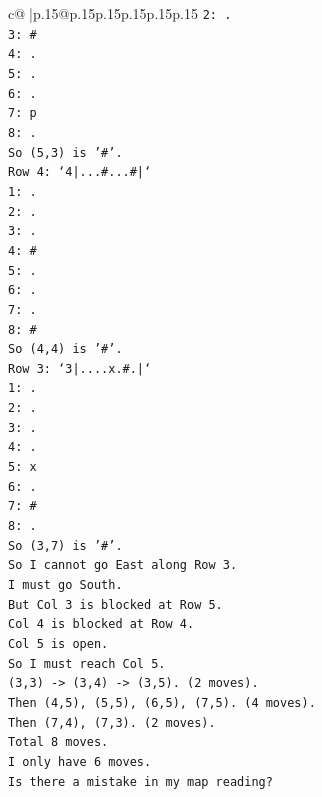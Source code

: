 \documentclass{article}
\begin{document}
{\begin{supertabular}{c@{$\;$}|p{.15\linewidth}@{}p{.15\linewidth}p{.15\linewidth}p{.15\linewidth}p{.15\linewidth}p{.15\linewidth}}
{{{\texttt{2: .} \\
\texttt{3: \#} \\
\texttt{4: .} \\
\texttt{5: .} \\
\texttt{6: .} \\
\texttt{7: p} \\
\texttt{8: .} \\
\texttt{So (5,3) is '\#'.} \\
\texttt{Row 4: `4|...\#...\#|`} \\
\texttt{1: .} \\
\texttt{2: .} \\
\texttt{3: .} \\
\texttt{4: \#} \\
\texttt{5: .} \\
\texttt{6: .} \\
\texttt{7: .} \\
\texttt{8: \#} \\
\texttt{So (4,4) is '\#'.} \\
\texttt{Row 3: `3|....x.\#.|`} \\
\texttt{1: .} \\
\texttt{2: .} \\
\texttt{3: .} \\
\texttt{4: .} \\
\texttt{5: x} \\
\texttt{6: .} \\
\texttt{7: \#} \\
\texttt{8: .} \\
\texttt{So (3,7) is '\#'.} \\
\texttt{So I cannot go East along Row 3.} \\
\texttt{I must go South.} \\
\texttt{But Col 3 is blocked at Row 5.} \\
\texttt{Col 4 is blocked at Row 4.} \\
\texttt{Col 5 is open.} \\
\texttt{So I must reach Col 5.} \\
\texttt{(3,3) {-}> (3,4) {-}> (3,5). (2 moves).} \\
\texttt{Then (4,5), (5,5), (6,5), (7,5). (4 moves).} \\
\texttt{Then (7,4), (7,3). (2 moves).} \\
\texttt{Total 8 moves.} \\
\texttt{I only have 6 moves.} \\
\texttt{Is there a mistake in my map reading?} \\
}}}
\end{supertabular}}
\end{document}
